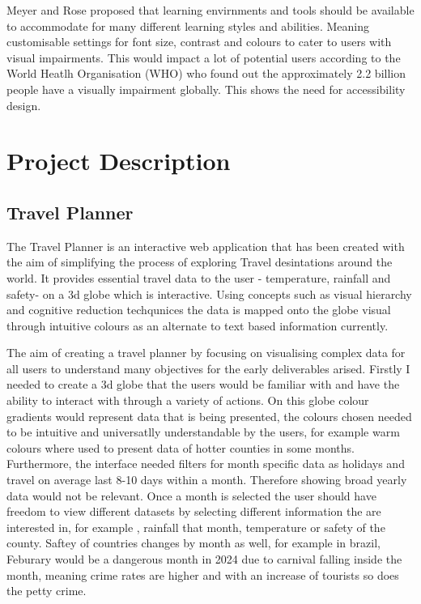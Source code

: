 \documentclass[]{project_interim}
\begin{document}
Meyer and Rose proposed that learning envirnments and tools should be available to accommodate for many different learning styles and abilities. Meaning customisable settings for font size, contrast and colours to cater to users with visual impairments. This would impact a lot of potential users according to the World Heatlh Organisation (WHO) who found out the approximately 2.2 billion people have a visually impairment globally. This shows the need for accessibility design.\cite{noauthor_world_nodate}

\chapter{Project Description}
\section{Travel Planner}

The Travel Planner is an interactive web application that has been created with the aim of simplifying the process of exploring Travel desintations around the world. It provides essential travel data to the user - temperature, rainfall and safety- on a 3d globe which is interactive. Using concepts such as visual hierarchy and cognitive reduction techqunices the data is mapped onto the globe visual through intuitive colours as an alternate to text based information currently.

The aim of creating a travel planner by focusing on visualising complex data for all users to understand many objectives for the early deliverables arised.
Firstly I needed to create a 3d globe that the users would be familiar with and have the ability to interact with through a variety of actions. On this globe colour gradients would represent data that is being presented, the colours chosen needed to be intuitive and universatlly understandable by the users, for example warm colours where used to present data of hotter counties in some months.
Furthermore, the interface needed filters for month specific data as holidays and travel on average last 8-10 days within a month. Therefore showing broad yearly data would not be relevant. Once a month is selected the user should have freedom to view different datasets by selecting different information the are interested in, for example , rainfall that month, temperature or safety of the county.
Saftey of countries changes by month as well, for example in brazil, Feburary would be a dangerous month in 2024 due to carnival falling inside the month, meaning crime rates are higher and with an increase of tourists so does the petty crime.
\end{document}
